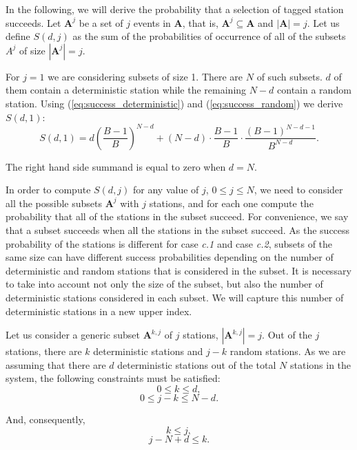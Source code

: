 \documentclass[journal]{IEEEtran}
\begin{document}
In the following, we will derive the probability that a selection of tagged station succeeds.
Let $\mathbf{A}^j$ be a set of $j$ events in $\mathbf{A}$, that is, $\mathbf{A}^j \subseteq \mathbf{A}$ and $|\mathbf{A}|=j$.
Let us define $S(d,j)$ as the sum of the probabilities of occurrence of all of the subsets $A^j$ of size $|\mathbf{A}^j|=j$.

For $j=1$ we are considering subsets of size 1.
There are $N$ of such subsets.
$d$ of them contain a deterministic station while the remaining $N-d$ contain a random station.
Using (\ref{eq:success_deterministic}) and (\ref{eq:success_random}) we derive $S(d,1)$:
\begin{equation}
S(d,1)=d \left( \frac{B-1}{B} \right)^{N-d} + (N-d)\cdot \frac{B-1}{B}\cdot \frac{(B-1)^{N-d-1}}{B^{N-d}}.
\end{equation}

The right hand side summand is equal to zero when $d=N$.

In order to compute $S(d,j)$ for any value of $j$, $0 \leq j \leq N$, we need to consider all the possible subsets $\mathbf{A}^j$ with $j$ stations, and for each one compute the probability that all of the stations in the subset succeed.
For convenience, we say that a subset succeeds when all the stations in the subset succeed.
As the success probability of the stations is different for case \emph{c.1} and case \emph{c.2}, subsets of the same size can have different success probabilities depending on the number of deterministic and random stations that is considered in the subset.
It is necessary to take into account not only the size of the subset, but also the number of deterministic stations considered in each subset.
We will capture this number of deterministic stations in a new upper index.

Let us consider a generic subset $\mathbf{A}^{k,j}$ of $j$ stations, $|\mathbf{A}^{k,j}|=j$.
Out of the $j$ stations, there are $k$ deterministic stations and $j-k$ random stations.
As we are assuming that there are $d$ deterministic stations out of the total $N$ stations in the system, the following constraints must be satisfied:
\begin{equation}
0 \leq k \leq d,
\end{equation}
\begin{equation}
0 \leq j-k \leq N -d.
\end{equation}

And, consequently,
\begin{equation}
\label{eq:ineq1}
 k \leq j,
\end{equation}
\begin{equation}
\label{eq:ineq2}
 j-N+d \leq k.
\end{equation}
\end{document}
